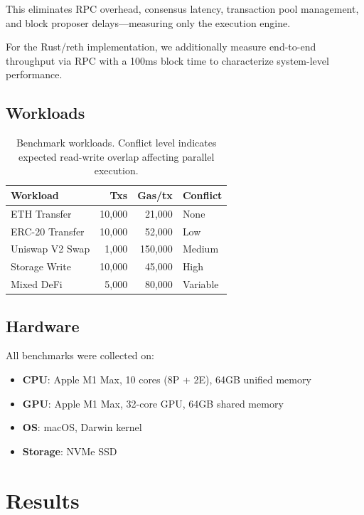 \documentclass[11pt,twocolumn]{article}
\begin{document}
This eliminates RPC overhead, consensus latency, transaction pool management,
and block proposer delays---measuring only the execution engine.

For the Rust/reth implementation, we additionally measure end-to-end throughput
via RPC with a 100ms block time to characterize system-level performance.

\subsection{Workloads}

\begin{table}[h]
\centering
\small
\begin{tabular}{lrrl}
\toprule
\textbf{Workload} & \textbf{Txs} & \textbf{Gas/tx} & \textbf{Conflict} \\
\midrule
ETH Transfer      & 10,000 & 21,000  & None \\
ERC-20 Transfer   & 10,000 & 52,000  & Low \\
Uniswap V2 Swap   & 1,000  & 150,000 & Medium \\
Storage Write      & 10,000 & 45,000  & High \\
Mixed DeFi         & 5,000  & 80,000  & Variable \\
\bottomrule
\end{tabular}
\caption{Benchmark workloads. Conflict level indicates expected read-write
overlap affecting parallel execution.}
\label{tab:workloads}
\end{table}

\subsection{Hardware}

All benchmarks were collected on:
\begin{itemize}
\item \textbf{CPU}: Apple M1 Max, 10 cores (8P + 2E), 64GB unified memory
\item \textbf{GPU}: Apple M1 Max, 32-core GPU, 64GB shared memory
\item \textbf{OS}: macOS, Darwin kernel
\item \textbf{Storage}: NVMe SSD
\end{itemize}

\section{Results}
\end{document}
